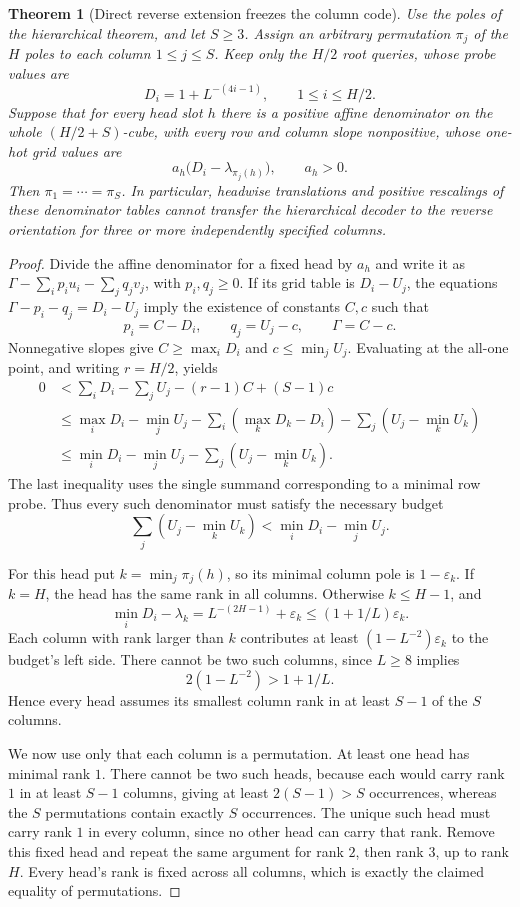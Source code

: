 \documentclass[11pt]{article}
\newtheorem{theorem}{Theorem}
\begin{document}
\begin{theorem}[Direct reverse extension freezes the column code]
Use the poles of the hierarchical theorem, and let $S\geq3$.
Assign an arbitrary permutation $\pi_j$ of the $H$ poles to each
column $1\leq j\leq S$. Keep only the $H/2$ root queries, whose
probe values are
\[
 D_i=1+L^{-(4i-1)},\qquad 1\leq i\leq H/2.
\]
Suppose that for every head slot $h$ there is a positive affine
denominator on the whole $(H/2+S)$-cube, with every row and column
slope nonpositive, whose one-hot grid values are
\[
 a_h\bigl(D_i-\lambda_{\pi_j(h)}\bigr),\qquad a_h>0.
\]
Then $\pi_1=\cdots=\pi_S$. In particular, headwise translations and
positive rescalings of these denominator tables cannot transfer the
hierarchical decoder to the reverse orientation for three or more
independently specified columns.
\end{theorem}
\begin{proof}
Divide the affine denominator for a fixed head by $a_h$ and write it
as $\Gamma-\sum_i p_i u_i-\sum_jq_jv_j$, with $p_i,q_j\geq0$.
If its grid table is $D_i-U_j$, the equations
$\Gamma-p_i-q_j=D_i-U_j$ imply the existence of constants $C,c$
such that
\[
 p_i=C-D_i,\qquad q_j=U_j-c,\qquad \Gamma=C-c.
\]
Nonnegative slopes give $C\geq\max_iD_i$ and
$c\leq\min_jU_j$. Evaluating at the all-one point, and writing
$r=H/2$, yields
\[
 \begin{aligned}
 0&<\sum_iD_i-\sum_jU_j-(r-1)C+(S-1)c\\
 &\leq\max_iD_i-\min_jU_j
       -\sum_i(\max_kD_k-D_i)-\sum_j(U_j-\min_kU_k)\\
 &\leq\min_iD_i-\min_jU_j-\sum_j(U_j-\min_kU_k).
 \end{aligned}
\]
The last inequality uses the single summand corresponding to a
minimal row probe. Thus every such denominator must satisfy the
necessary budget
\[
 \sum_j(U_j-\min_kU_k)<\min_iD_i-\min_jU_j.
\]

For this head put $k=\min_j\pi_j(h)$, so its minimal column pole
is $1-\varepsilon_k$. If $k=H$, the head has the same rank in all
columns. Otherwise $k\leq H-1$, and
\[
 \min_iD_i-\lambda_k
 =L^{-(2H-1)}+\varepsilon_k
 \leq(1+1/L)\varepsilon_k.
\]
Each column with rank larger than $k$ contributes at least
$(1-L^{-2})\varepsilon_k$ to the budget's left side. There cannot
be two such columns, since $L\geq8$ implies
\[
 2(1-L^{-2})>1+1/L.
\]
Hence every head assumes its smallest column rank in at least
$S-1$ of the $S$ columns.

We now use only that each column is a permutation. At least one head
has minimal rank $1$. There cannot be two such heads, because each
would carry rank $1$ in at least $S-1$ columns, giving at least
$2(S-1)>S$ occurrences, whereas the $S$ permutations contain exactly
$S$ occurrences. The unique such head must carry rank $1$ in every
column, since no other head can carry that rank. Remove this fixed
head and repeat the same argument for rank $2$, then rank $3$, up
to rank $H$. Every head's rank is fixed across all columns, which
is exactly the claimed equality of permutations.
\end{proof}
\end{document}
